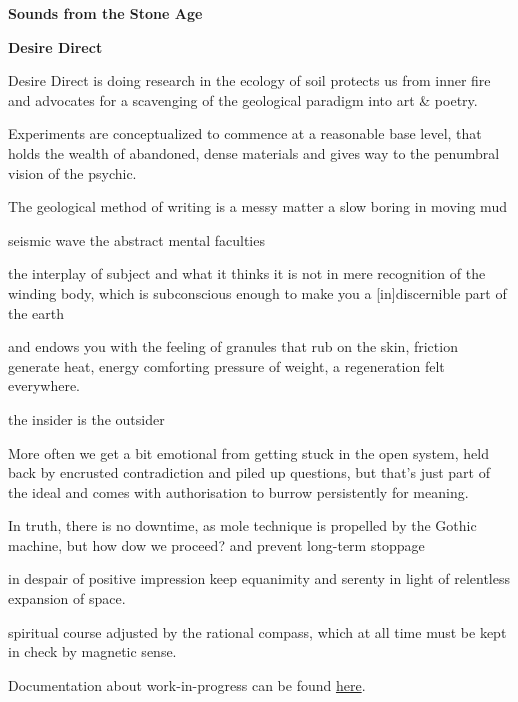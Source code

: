 \documentclass{article}
\begin{document}
\begin{titlepage}	%
\setcounter{page}{0}
	\Centering		
	{\Huge\bfseries Sounds from the Stone Age}
	
	\vspace{47pt} 
	{\Large\bfseries Desire Direct}

		 \vspace{85pt}
\justifying
\setlength{\parindent}{0pt}
Desire Direct is doing research in the ecology of soil
protects us from inner fire
	and advocates for a scavenging of the geological paradigm into art \& poetry. 
	

	Experiments are conceptualized to commence at a reasonable base level, that holds the wealth of abandoned, dense materials 
and gives way to the penumbral vision of the psychic. 

The geological method of writing is a messy matter
a slow boring in moving mud 
	
seismic	wave the abstract mental faculties

	the interplay of subject and what it thinks it is not
in mere recognition of the  winding body, 
	which is subconscious enough to make you a [in]discernible part of the earth

and endows you with the feeling of granules that rub on the skin, 
friction generate heat, energy
	comforting pressure of weight, 
a regeneration felt everywhere.


	the insider is the outsider

	More often we get a bit emotional from getting stuck in the open system, 
held back by encrusted contradiction and piled up questions, 
	but that's just part of the ideal and comes with 
	authorisation to burrow persistently for meaning. 

	In truth, there is no downtime, as mole technique is propelled by the Gothic machine,
but how dow we proceed? and prevent long-term stoppage
	

in despair of positive impression
keep equanimity and serenty in light of relentless expansion of space.

	spiritual course adjusted by the rational compass, 
	which at all time must be kept in check by magnetic sense.



		\vspace{11pt} 
Documentation about work-in-progress can be found \href{https://desire-direct.github.io/}{here}.

	 \end{titlepage}
\end{document}
